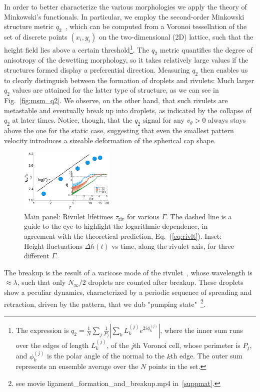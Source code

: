 In order to better characterize the various morphologies we apply the theory of Minkowski's functionals. 
In particular, we employ the second-order Minkowski structure metric $q_2$~\cite{mickelShortcomingsBondOrientational2013, schallerPapaya22DIrreducible2020}, which can be computed from a Voronoi tessellation of the set of discrete points $(x_i, y_i)$ on the two-dimensional (2D) lattice, such that the height field lies above a certain threshold\footnote{The expression is $q_2 = \frac{1}{N}\sum_j \frac{1}{P_j}|\sum_k L^{(j)}_k e^{2i\phi^{(j)}_k}|$, where the inner sum runs over the edges of length $L^{(j)}_k$, of the $j$th Voronoi cell, whose perimeter is $P_j$, and $\phi^{(j)}_k$ is the polar angle of the normal to the $k$th edge. 
The outer sum represents an ensemble average over the $N$ points in the set.}. The $q_2$ metric quantifies the degree of anisotropy of the dewetting morphology, so it takes relatively large values if the structures formed display a preferential direction. 
Measuring $q_2$ then enables us to clearly distinguish between the formation of droplets and rivulets: Much larger $q_2$ values are attained for the latter type of structure, as we can see in Fig.~\ref{fig:msm_q2}.
We observe, on the other hand, that such rivulets are metastable and eventually break up into droplets, as indicated by the collapse of $q_2$ at later times. 
Notice, though, that the $q_2$ signal for any $v_{\theta} >0$ always stays above the one for the static case, suggesting that even the smallest pattern velocity introduces a sizeable deformation of the spherical cap shape.
\begin{figure}
    \centering
    \includegraphics[width=0.4\textwidth]{graphics/Figure_5.pdf}
    \caption{Main panel: Rivulet lifetimes $\tau_{\text{riv}}$ for various $\Gamma$.
    The dashed line is a guide to the eye to highlight the logarithmic dependence, in agreement with the theoretical prediction, Eq.~(\ref{eq:rivlt}).
    Inset: Height fluctuations $\Delta h(t)$ vs time, along the rivulet axis, for three different $\Gamma$.
    }
    \label{fig:stab_ligs_lam2}
\end{figure}
The breakup is the result of a varicose mode of the rivulet~\cite{diezBreakupFluidRivulets2009, mechkovStabilityLiquidRidges2008}, whose wavelength is $\approx\lambda$, such that only $N_{\infty}/2$ droplets are counted after breakup. 
These droplets show a peculiar dynamics, characterized by a periodic sequence of spreading and retraction, driven by the pattern, that we dub "pumping state"~\footnote{see movie ligament\_formation\_and\_breakup.mp4 in~\ref{suppmat}.}.

